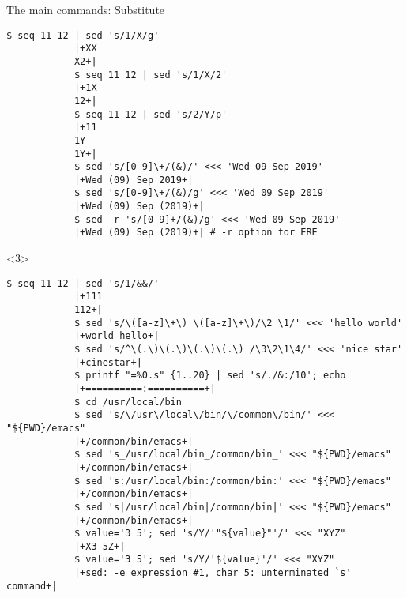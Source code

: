 \begin{frame}[fragile]{The main commands: Substitute}
\begin{onlyenv}
\begin{lstlisting}[style=MyBash]
            $ seq 11 12 | sed 's/1/X/g'
            |+XX
            X2+|
            $ seq 11 12 | sed 's/1/X/2'
            |+1X
            12+|
            $ seq 11 12 | sed 's/2/Y/p'
            |+11
            1Y
            1Y+|
            $ sed 's/[0-9]\+/(&)/' <<< 'Wed 09 Sep 2019'
            |+Wed (09) Sep 2019+|
            $ sed 's/[0-9]\+/(&)/g' <<< 'Wed 09 Sep 2019'
            |+Wed (09) Sep (2019)+|
            $ sed -r 's/[0-9]+/(&)/g' <<< 'Wed 09 Sep 2019'
            |+Wed (09) Sep (2019)+| # -r option for ERE
        \end{lstlisting}
    \end{onlyenv}
    \begin{onlyenv}<3>
        \begin{lstlisting}[style=MyBash, firstnumber=23, xrightmargin=2mm]
            $ seq 11 12 | sed 's/1/&&/'
            |+111
            112+|
            $ sed 's/\([a-z]\+\) \([a-z]\+\)/\2 \1/' <<< 'hello world'
            |+world hello+|
            $ sed 's/^\(.\)\(.\)\(.\)\(.\) /\3\2\1\4/' <<< 'nice star'
            |+cinestar+|
            $ printf "=%0.s" {1..20} | sed 's/./&:/10'; echo
            |+==========:==========+|
            $ cd /usr/local/bin
            $ sed 's/\/usr\/local\/bin/\/common\/bin/' <<< "${PWD}/emacs"
            |+/common/bin/emacs+|
            $ sed 's_/usr/local/bin_/common/bin_' <<< "${PWD}/emacs"
            |+/common/bin/emacs+|
            $ sed 's:/usr/local/bin:/common/bin:' <<< "${PWD}/emacs"
            |+/common/bin/emacs+|
            $ sed 's|/usr/local/bin|/common/bin|' <<< "${PWD}/emacs"
            |+/common/bin/emacs+|
            $ value='3 5'; sed 's/Y/'"${value}"'/' <<< "XYZ"
            |+X3 5Z+|
            $ value='3 5'; sed 's/Y/'${value}'/' <<< "XYZ"
            |+sed: -e expression #1, char 5: unterminated `s' command+|
        \end{lstlisting}
    \end{onlyenv}
\end{frame}
